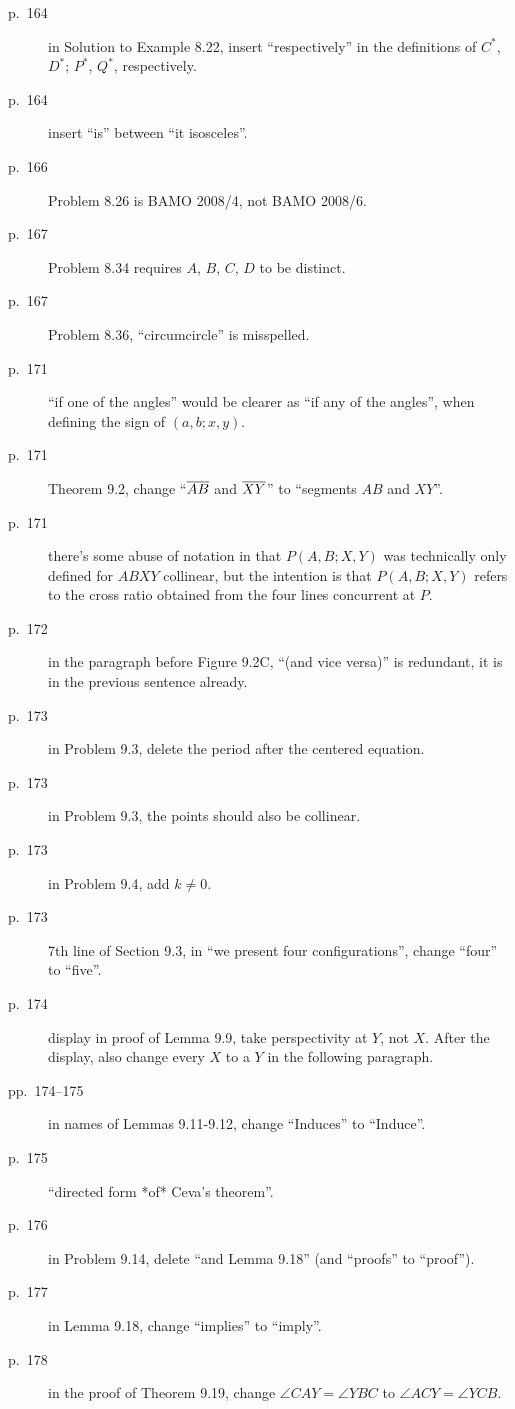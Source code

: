 \documentclass[11pt]{scrartcl}
\begin{document}
\begin{description}
\item[p.\  164] in Solution to Example 8.22, insert ``respectively''
  in the definitions of $C^\ast$, $D^\ast$; $P^\ast$, $Q^\ast$, respectively.
\item[p.\  164] insert ``is'' between ``it isosceles''.
\item[p.\  166] Problem 8.26 is BAMO 2008/4, not BAMO 2008/6.
\item[p.\  167] Problem 8.34 requires $A$, $B$, $C$, $D$ to be distinct.
\item[p.\  167] Problem 8.36, ``circumcircle'' is misspelled.
\item[p.\  171] ``if one of the angles'' would be clearer as ``if any of the
  angles'', when defining the sign of $(a,b;x,y)$.
\item[p.\  171] Theorem 9.2, change ``$\overline{AB}$ and $\overline{XY}$'' to ``segments $AB$ and $XY$''.
\item[p.\  171] there's some abuse of notation in that $P(A,B;X,Y)$
  was technically only defined for $ABXY$ collinear,
  but the intention is that $P(A,B;X,Y)$ refers to the cross ratio obtained
  from the four lines concurrent at $P$.
\item[p.\  172] in the paragraph before Figure 9.2C,
  ``(and vice versa)'' is redundant, it is in the previous sentence already.
\item[p.\  173] in Problem 9.3, delete the period after the centered equation.
\item[p.\  173] in Problem 9.3, the points should also be collinear.
\item[p.\  173] in Problem 9.4, add $k \neq 0$.
\item[p.\  173] 7th line of Section 9.3, in ``we present four configurations'',
  change ``four'' to ``five''.
\item[p.\  174] display in proof of Lemma 9.9, take perspectivity at $Y$, not $X$.
  After the display, also change every $X$ to a $Y$ in the following paragraph.
\item[pp.\  174--175] in names of Lemmas 9.11-9.12,
  change ``Induces'' to ``Induce''.
\item[p.\  175] ``directed form *of* Ceva's theorem''.
\item[p.\  176] in Problem 9.14, delete ``and Lemma 9.18'' (and ``proofs'' to ``proof'').
\item[p.\  177] in Lemma 9.18, change ``implies'' to ``imply''.
\item[p.\  178] in the proof of Theorem 9.19, change $\angle CAY = \angle YBC$ to $\angle ACY = \angle YCB$.

\end{description}
\end{document}
